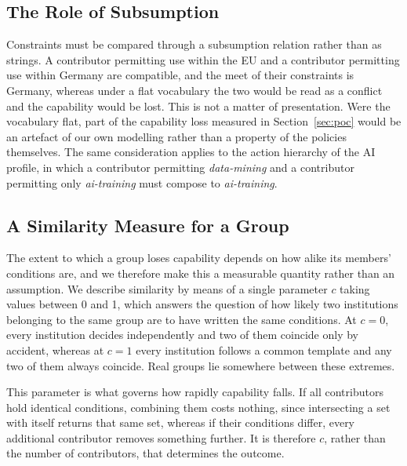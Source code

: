 \documentclass[sigconf,anonymous,review]{acmart}
\begin{document}
\subsection{The Role of Subsumption}

Constraints must be compared through a subsumption relation rather than as
strings. A contributor permitting use within the EU and a contributor permitting
use within Germany are compatible, and the meet of their constraints is Germany,
whereas under a flat vocabulary the two would be read as a conflict and the
capability would be lost. This is not a matter of presentation. Were the
vocabulary flat, part of the capability loss measured in Section~\ref{sec:poc}
would be an artefact of our own modelling rather than a property of the policies
themselves. The same consideration applies to the action hierarchy of the AI
profile, in which a contributor permitting \emph{data-mining} and a contributor
permitting only \emph{ai-training} must compose to \emph{ai-training}.

\subsection{A Similarity Measure for a Group}
\label{sec:similarity}

The extent to which a group loses capability depends on how alike its members'
conditions are, and we therefore make this a measurable quantity rather than an
assumption. We describe similarity by means of a single parameter $c$ taking
values between 0 and 1, which answers the question of how likely two institutions
belonging to the same group are to have written the same conditions. At $c=0$,
every institution decides independently and two of them coincide only by
accident, whereas at $c=1$ every institution follows a common template and any
two of them always coincide. Real groups lie somewhere between these extremes.

This parameter is what governs how rapidly capability falls. If all contributors
hold identical conditions, combining them costs nothing, since intersecting a set
with itself returns that same set, whereas if their conditions differ, every
additional contributor removes something further. It is therefore $c$, rather
than the number of contributors, that determines the outcome.
\end{document}
